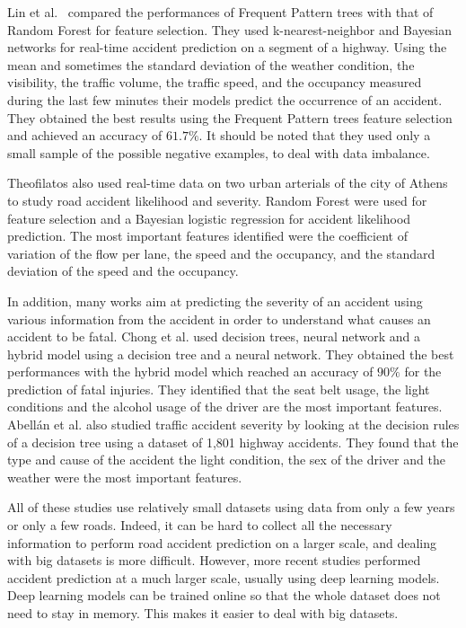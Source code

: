 \documentclass[conference]{IEEEtran}
\begin{document}
Lin et
al.~\cite{Lin2015} compared the performances of Frequent Pattern trees\cite{Han2004} with
that of Random Forest for feature selection. They used k-nearest-neighbor
and Bayesian networks for real-time accident prediction on a segment of
a highway. Using the mean and sometimes the standard deviation of the weather condition, the visibility, the traffic volume, the traffic speed, and the occupancy measured during the last few minutes their models predict the occurrence of an accident. They obtained
the best results using the Frequent Pattern trees feature selection and achieved
an accuracy of $61.7\%$. It should be noted that they used only a small sample of the
possible negative examples, to deal with data imbalance. 

Theofilatos\cite{Theofilatos2017} also used
real-time data on two urban arterials of the city of Athens to study road
accident likelihood and severity. Random Forest were used for feature
selection and a Bayesian logistic regression for accident likelihood
prediction. The most important features identified were the coefficient of
variation of the flow per lane, the speed and the occupancy, and the
standard deviation of the speed and the occupancy. 

In addition, many
works aim at predicting the severity of an accident using various
information from the accident in order to understand what causes an
accident to be fatal. Chong et al.\cite{Chong2005} used decision trees,
neural network and a hybrid model using a decision tree and a neural
network. They obtained the best performances with the hybrid model which
reached an accuracy of $90\%$ for the prediction of fatal injuries. They
identified that the seat belt usage, the light conditions and the alcohol
usage of the driver are the most important features. Abellán et al.
\cite{Abellan2013} also studied traffic accident severity by looking at the
decision rules of a decision tree using a dataset of 1,801 highway
accidents. They found that the type and cause of the accident the light
condition, the sex of the driver and the weather were the most important
features.

All of these studies use relatively small datasets using data from only a
few years or only a few roads. Indeed, it can be hard to collect all the
necessary information to perform road accident prediction on a larger
scale, and dealing with big datasets is more difficult. However, more
recent studies \cite{QChen2016, Najjar2017, Yuan2018} performed accident prediction at a much larger scale,
usually using deep learning models. Deep learning models can be trained
online so that the whole dataset does not need to stay in memory. This
makes it easier to deal with big datasets.
\end{document}
